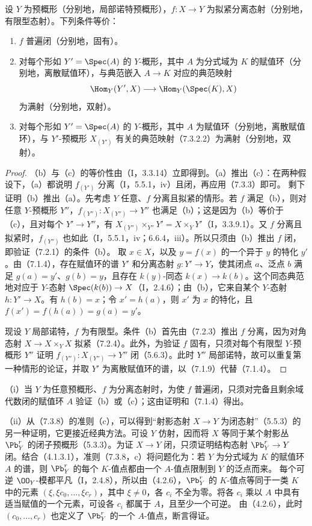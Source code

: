 设 $Y$ 为预概形（分别地，局部诺特预概形），$f:X\to Y$ 为拟紧分离态射（分别地，有限型态射）。下列条件等价：
\begin{enumerate}[label=\alph*)]
\item $f$ 普遍闭（分别地，固有）。
\item 对每个形如 $Y'=\Spec(A)$ 的 $Y$-概形，其中 $A$ 为分式域为 $K$ 的赋值环（分别地，离散赋值环），与典范嵌入 $A\to K$ 对应的典范映射
\[
\Hom_Y(Y',X)\longrightarrow\Hom_Y(\Spec(K),X)
\]
为满射（分别地，双射）。
\item 对每个形如 $Y'=\Spec(A)$ 的 $Y$-概形，其中 $A$ 为赋值环（分别地，离散赋值环），与 $Y'$-预概形 $X_{(Y')}$ 有关的典范映射（7.3.2.2）为满射（分别地，双射）。
\end{enumerate}
\begin{proof}
（b）与（c）的等价性由（I，3.3.14）立即得到。（a）推出（c）：在两种假设下，（a）都说明 $f_{(Y')}$ 分离（I，5.5.1，iv）且闭，再应用（7.3.3）即可。
剩下证明（b）推出（a）。先考虑 $Y$ 任意、$f$ 分离且拟紧的情形。若 $f$ 满足（b），则对任意 $Y$-预概形 $Y''$，$f_{(Y'')}:X_{(Y'')}\to Y''$ 也满足（b）；这是因为（b）等价于（c），且对每个 $Y'\to Y''$，有
$X_{(Y'')}\times_{Y''}Y'=X\times_Y Y'$（I，3.3.9.1）。又 $f$ 分离且拟紧时，$f_{(Y'')}$ 也如此（I，5.5.1，iv；6.6.4，iii）。所以只须由（b）推出 $f$ 闭，即验证（7.2.1）的条件（b）。
取 $x\in X$，以及 $y=f(x)$ 的一个异于 $y$ 的特化 $y'$。由（7.1.4），存在赋值环的谱 $Y'$ 和分离态射 $g:Y'\to Y$，使其闭点 $a$、泛点 $b$ 满足 $g(a)=y'$、$g(b)=y$，且存在 $k(y)$-同态 $k(x)\to k(b)$。这个同态典范地对应于 $Y$-态射 $\Spec(k(b))\to X$（I，2.4.6）；由（b），它来自某个 $Y$-态射 $h:Y'\to X$。有 $h(b)=x$；令 $x'=h(a)$，则 $x'$ 为 $x$ 的特化，且
$f(x')=f(h(a))=g(a)=y'$。

现设 $Y$ 局部诺特，$f$ 为有限型。条件（b）首先由（7.2.3）推出 $f$ 分离，因为对角态射 $X\to X\times_Y X$ 拟紧（7.2.4）。此外，为验证 $f$ 固有，只须对每个有限型 $Y$-预概形 $Y''$ 证明 $f_{(Y'')}:X_{(Y'')}\to Y''$ 闭（5.6.3）。此时 $Y''$ 局部诺特，故可以重复第一种情形的论证，并取 $Y'$ 为离散赋值环的谱，以（7.1.9）代替（7.1.4）。
\end{proof}

（i）当 $Y$ 为任意预概形、$f$ 为分离态射时，为使 $f$ 普遍闭，只须对完备且剩余域代数闭的赋值环 $A$ 验证（b）或（c）；这由证明和（7.1.4）得出。

（ii）从（7.3.8）的准则（c），可以得到“射影态射 $X\to Y$ 为闭态射”（5.5.3）的另一种证明，它更接近经典方法。可设 $Y$ 仿射，因而将 $X$ 等同于某个射影丛 $\Pb_Y^r$ 的闭子预概形（5.3.3）。为证 $X\to Y$ 闭，只须证明结构态射 $\Pb_Y^r\to Y$ 闭。结合（4.1.3.1），准则（7.3.8，c）将问题化为：若 $Y$ 为分式域为 $K$ 的赋值环 $A$ 的谱，则 $\Pb_Y^r$ 的每个 $K$-值点都由一个 $A$-值点限制到 $Y$ 的泛点而来。
每个可逆 $\OO_Y$-模都平凡（I，2.4.8），所以由（4.2.6），$\Pb_Y^r$ 的 $K$-值点等同于一类 $K$ 中的元素 $(\xi,\xi c_0,\ldots,\xi c_r)$，其中 $\xi\ne0$，各 $c_i$ 不全为零。将各 $c_i$ 乘以 $A$ 中具有适当赋值的一个元素，可设各 $c_i$ 都属于 $A$，且至少一个可逆。
由（4.2.6），此时 $(c_0,\ldots,c_r)$ 也定义了 $\Pb_Y^r$ 的一个 $A$-值点，断言得证。

